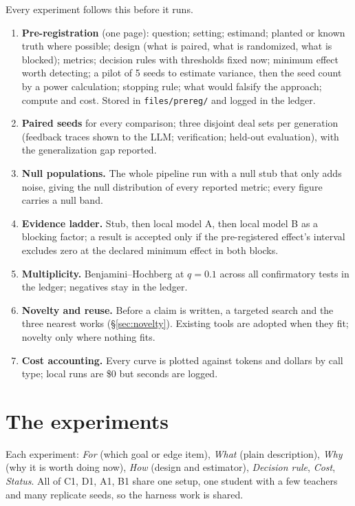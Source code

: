 \documentclass[11pt]{article}
\begin{document}
Every experiment follows this before it runs.
\begin{enumerate}
\item \textbf{Pre-registration} (one page): question; setting; estimand; planted or known truth where possible;
design (what is paired, what is randomized, what is blocked); metrics; decision rules with thresholds fixed now;
minimum effect worth detecting; a pilot of 5 seeds to estimate variance, then the seed count by a power calculation;
stopping rule; what would falsify the approach; compute and cost. Stored in \texttt{files/prereg/} and logged in
the ledger.
\item \textbf{Paired seeds} for every comparison; three disjoint deal sets per generation (feedback traces shown to
the LLM; verification; held-out evaluation), with the generalization gap reported.
\item \textbf{Null populations.} The whole pipeline run with a null stub that only adds noise, giving the null
distribution of every reported metric; every figure carries a null band.
\item \textbf{Evidence ladder.} Stub, then local model A, then local model B as a blocking factor; a result is
accepted only if the pre-registered effect's interval excludes zero at the declared minimum effect in both blocks.
\item \textbf{Multiplicity.} Benjamini--Hochberg at $q=0.1$ across all confirmatory tests in the ledger; negatives
stay in the ledger.
\item \textbf{Novelty and reuse.} Before a claim is written, a targeted search and the three nearest works
(\S\ref{sec:novelty}). Existing tools are adopted when they fit; novelty only where nothing fits.
\item \textbf{Cost accounting.} Every curve is plotted against tokens and dollars by call type; local runs are
\$0 but seconds are logged.
\end{enumerate}

\section{The experiments}\label{sec:experiments}

Each experiment: \emph{For} (which goal or edge item), \emph{What} (plain description), \emph{Why} (why it is worth
doing now), \emph{How} (design and estimator), \emph{Decision rule}, \emph{Cost}, \emph{Status}. All of C1, D1,
A1, B1 share one setup, one student with a few teachers and many replicate seeds, so the harness work is shared.
\end{document}
